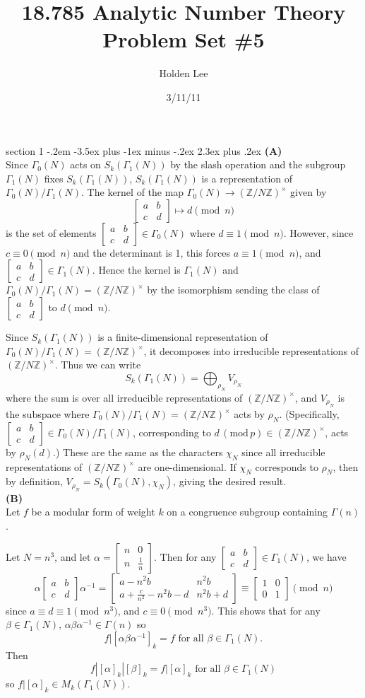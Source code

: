\documentclass[12pt]{article}
\makeatletter
\theoremstyle{norm}
\newcommand{\Z}[0]{\mathbb{Z}}
\newcommand{\rc}[1]{\frac{1}{#1}}
\newcommand{\al}[0]{\alpha}
\newcommand{\be}[0]{\beta}
\newcommand{\Ga}[0]{\Gamma}
\newcommand{\subprob}[1]{\noindent\textbf{#1}\\}
\newcommand{\nmod}[1]{\,(\text{mod}\, #1)}
\newcommand{\matt}[4]{
\left[
\begin{matrix}
{#1}&{#2}\\
{#3}&{#4}
\end{matrix}
\right]}
\newcommand{\smatt}[4]{
\left[
\begin{smallmatrix}
{#1}&{#2}\\
{#3}&{#4}
\end{smallmatrix}
\right]}
\newenvironment{problem}{\@startsection
       {section}
       {1}
       {-.2em}
       {-3.5ex plus -1ex minus -.2ex}
       {2.3ex plus .2ex}
       {\pagebreak[3]%
       \large\bf\noindent{Problem }
       }
       }
       {%
       }
\makeatother
\begin{document}
\title{18.785 Analytic Number Theory Problem Set \#5}%
\author{Holden Lee}
\date{3/11/11}%
\maketitle
\thispagestyle{empty}

\begin{problem}{\it }
\subprob{(A)}
Since $\Ga_0(N)$ acts on $S_k(\Ga_1(N))$ by the slash operation and the subgroup $\Ga_1(N)$ fixes $S_k(\Ga_1(N))$, $S_k(\Ga_1(N))$ is a representation of $\Ga_0(N)/\Ga_1(N)$.
The kernel of the map $\Ga_0(N)\to (\Z/N\Z)^{\times}$ given by
\[
\matt abcd\mapsto d\pmod n
\]
 is the set of elements $\smatt abcd\in \Ga_0(N)$ where $d\equiv 1\pmod n$. However, since $c\equiv 0\pmod n$ and the determinant is 1, this forces $a\equiv 1 \pmod n$, and $\smatt abcd\in \Ga_1(N)$.
Hence the kernel is $\Ga_1(N)$ and $\Ga_0(N)/\Ga_1(N)=(\Z/N\Z)^{\times}$ by the isomorphism sending the class of $\smatt abcd$ to $d\pmod n$.

Since $S_k(\Ga_1(N))$ is a finite-dimensional representation of $\Ga_0(N)/\Ga_1(N)=(\Z/N\Z)^{\times}$, it decomposes into irreducible representations of $(\Z/N\Z)^{\times}$. Thus we can write
\[
S_k(\Ga_1(N))=\bigoplus_{\rho_N} V_{\rho_N}
\]
where the sum is over all irreducible representations of $(\Z/N\Z)^{\times}$, and $V_{\rho_N}$ is the subspace where $\Ga_0(N)/\Ga_1(N)=(\Z/N\Z)^{\times}$ acts by $\rho_N$. 
(Specifically, $\smatt abcd\in \Ga_0(N)/\Ga_1(N)$, corresponding to $d\nmod p\in (\Z/N\Z)^{\times}$, acts by $\rho_N(d)$.)
These are the same as the characters $\chi_N$ since all irreducible representations of $(\Z/N\Z)^{\times}$ are one-dimensional. If $\chi_N$ corresponds to $\rho_N$, 
then by definition, $V_{\rho_N}=S_k(\Ga_0(N),\chi_N)$, giving the desired result.\\

\subprob{(B)}
Let $f$ be a modular form of weight $k$ on a congruence subgroup containing $\Ga(n)$.

Let $N=n^3$, and let $\al=\smatt n0n{\rc n}$. Then for any $\matt abcd\in \Ga_1(N)$, we have
\[
\al\matt abcd \al^{-1}=\matt{a-n^2b}{n^2b}{a+\frac{c}{n^2}-n^2b-d}{n^2b+d}\equiv \matt 1001\pmod n
\]
since $a\equiv d\equiv 1\pmod{n^3}$, and $c\equiv 0\pmod{n^3}$. This shows that for any $\be\in \Ga_1(N)$, $\al\be\al^{-1}\in \Ga(n)$ so 
\[f|[\al\be\al^{-1}]_k=f\text{ for all }\be\in \Ga_1(N).\]
Then
\[
f|[\al]_k|[\be]_k=f|[\al]_k\text{ for all }\be\in \Ga_1(N)
\]
so $f|[\al]_k\in M_k(\Ga_1(N))$.
\end{problem}
\end{document}
